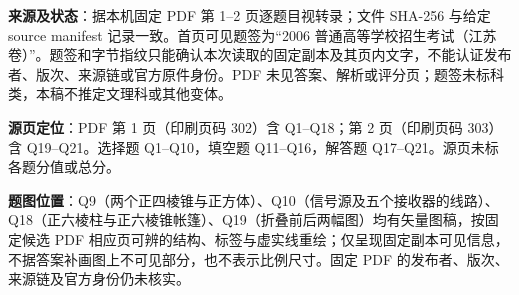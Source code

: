 

\begin{gktip}
\textbf{来源及状态}：据本机固定 PDF 第 1–2 页逐题目视转录；文件 SHA-256 与给定 source manifest 记录一致。首页可见题签为“2006 普通高等学校招生考试（江苏卷）”。题签和字节指纹只能确认本次读取的固定副本及其页内文字，不能认证发布者、版次、来源链或官方原件身份。PDF 未见答案、解析或评分页；题签未标科类，本稿不推定文理科或其他变体。

\textbf{源页定位}：PDF 第 1 页（印刷页码 302）含 Q1–Q18；第 2 页（印刷页码 303）含 Q19–Q21。选择题 Q1–Q10，填空题 Q11–Q16，解答题 Q17–Q21。源页未标各题分值或总分。

\textbf{题图位置}：Q9（两个正四棱锥与正方体）、Q10（信号源及五个接收器的线路）、Q18（正六棱柱与正六棱锥帐篷）、Q19（折叠前后两幅图）均有矢量图稿，按固定候选 PDF 相应页可辨的结构、标签与虚实线重绘；仅呈现固定副本可见信息，不据答案补画图上不可见部分，也不表示比例尺寸。固定 PDF 的发布者、版次、来源链及官方身份仍未核实。
\end{gktip}


